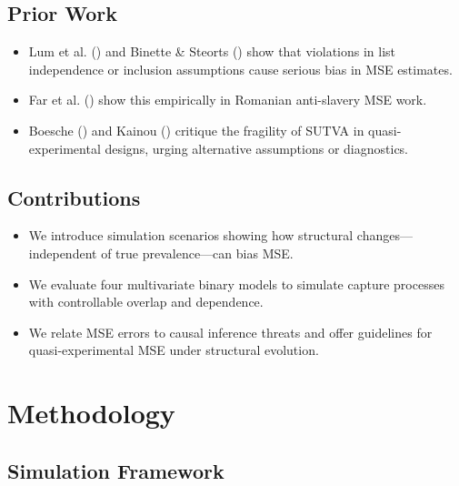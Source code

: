 \documentclass[
  12pt,
]{article}
\providecommand{\tightlist}{%
  \setlength{\itemsep}{0pt}\setlength{\parskip}{0pt}}\usepackage{longtable,booktabs,array}
\theoremstyle{plain}
\theoremstyle{definition}
\begin{document}
\subsection{Prior Work}\label{prior-work}

\begin{itemize}
\tightlist
\item
  Lum et al. () and Binette \&
  Steorts () show that violations
  in list independence or inclusion assumptions cause serious bias in
  MSE estimates.\\
\item
  Far et al. () show this empirically
  in Romanian anti-slavery MSE work.\\
\item
  Boesche () and Kainou
  () critique the fragility of SUTVA
  in quasi-experimental designs, urging alternative assumptions or
  diagnostics.
\end{itemize}

\subsection{Contributions}\label{contributions}

\begin{itemize}
\tightlist
\item
  We introduce simulation scenarios showing how structural
  changes---independent of true prevalence---can bias MSE.
\item
  We evaluate four multivariate binary models to simulate capture
  processes with controllable overlap and dependence.
\item
  We relate MSE errors to causal inference threats and offer guidelines
  for quasi-experimental MSE under structural evolution.
\end{itemize}

\section{Methodology}\label{methodology}

\subsection{Simulation Framework}\label{simulation-framework}
\end{document}
